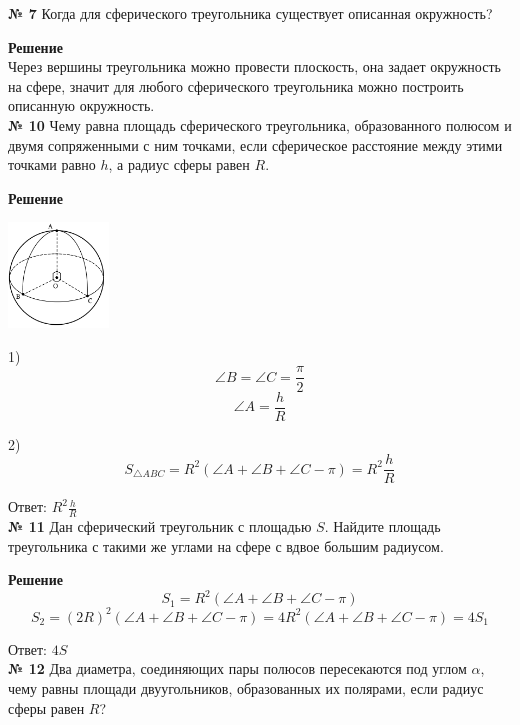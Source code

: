     \textbf{№ 7}
    Когда для сферического треугольника существует описанная окружность?

    \textbf{Решение}\\

    Через вершины треугольника можно провести плоскость, она задает окружность на сфере,
    значит для любого сферического треугольника можно построить описанную окружность.\\


    \textbf{№ 10}
    Чему равна площадь сферического треугольника, образованного полюсом и двумя сопряженными с ним точками,
    если сферическое расстояние между этими точками равно $h$, а радиус сферы равен $R$.

    \textbf{Решение}\\

    \begin{center}
        \includegraphics[width=0.2\textwidth]{images/img5}\\
    \end{center}

    1)
    \[
        \angle B = \angle C = \frac{\pi}{2}
    \]
    \[
        \angle A = \frac{h}{R}
    \]

    2) \[
           S_{\triangle ABC} = R^2(\angle A + \angle B + \angle C - \pi) = R^2\frac{h}{R}
    \]

    Ответ: $R^2\frac{h}{R}$\\


    \textbf{№ 11}
    Дан сферический треугольник с площадью $S$.
    Найдите площадь треугольника с такими же углами на сфере с вдвое большим радиусом.

    \textbf{Решение}\\

    \[
        S_1 = R^2(\angle A + \angle B + \angle C - \pi)
    \]
    \[
        S_2 = (2R)^2(\angle A + \angle B + \angle C - \pi) = 4R^2(\angle A + \angle B + \angle C - \pi) = 4S_1
    \]

    Ответ: $4S$\\


    \textbf{№ 12}
    Два диаметра, соединяющих пары полюсов пересекаются под углом $\alpha$,
    чему равны площади двуугольников, образованных их полярами, если радиус сферы равен $R$?

